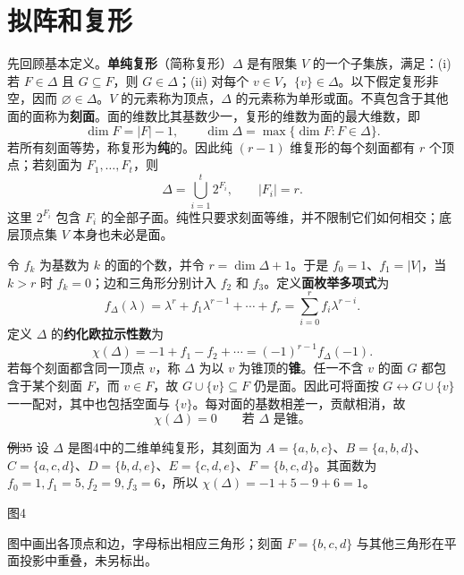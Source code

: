 \section*{拟阵和复形}
先回顾基本定义。\textbf{单纯复形}（简称复形）$\Delta$ 是有限集 $V$ 的一个子集族，满足：(i) 若 $F\in\Delta$ 且 $G\subseteq F$，则 $G\in\Delta$；(ii) 对每个 $v\in V$，$\{v\}\in\Delta$。以下假定复形非空，因而 $\varnothing\in\Delta$。$V$ 的元素称为顶点，$\Delta$ 的元素称为单形或面。不真包含于其他面的面称为\textbf{刻面}。面的维数比其基数少一，复形的维数为面的最大维数，即
\[\dim F=|F|-1,\qquad\dim\Delta=\max\{\dim F:F\in\Delta\}.\]
若所有刻面等势，称复形为\textbf{纯}的。因此纯 $(r-1)$ 维复形的每个刻面都有 $r$ 个顶点；若刻面为 $F_1,\ldots,F_t$，则
\[\Delta=\bigcup_{i=1}^t2^{F_i},\qquad |F_i|=r.\]
这里 $2^{F_i}$ 包含 $F_i$ 的全部子面。纯性只要求刻面等维，并不限制它们如何相交；底层顶点集 $V$ 本身也未必是面。

令 $f_k$ 为基数为 $k$ 的面的个数，并令 $r=\dim\Delta+1$。于是 $f_0=1$、$f_1=|V|$，当 $k>r$ 时 $f_k=0$；边和三角形分别计入 $f_2$ 和 $f_3$。定义\textbf{面枚举多项式}为
\[f_\Delta(\lambda)=\lambda^r+f_1\lambda^{r-1}+\cdots+f_r=\sum_{i=0}^rf_i\lambda^{r-i}.\tag{3}\label{eq:complex-face}\]
定义 $\Delta$ 的\textbf{约化欧拉示性数}为
\[\chi(\Delta)=-1+f_1-f_2+\cdots=(-1)^{r-1}f_\Delta(-1).\]
若每个刻面都含同一顶点 $v$，称 $\Delta$ 为以 $v$ 为锥顶的\textbf{锥}。任一不含 $v$ 的面 $G$ 都包含于某个刻面 $F$，而 $v\in F$，故 $G\cup\{v\}\subseteq F$ 仍是面。因此可将面按 $G\longleftrightarrow G\cup\{v\}$ 一一配对，其中也包括空面与 $\{v\}$。每对面的基数相差一，贡献相消，故
\[\chi(\Delta)=0\qquad\text{若 }\Delta\text{ 是锥。}\tag{4}\]

\st{例35} 设 $\Delta$ 是图4中的二维单纯复形，其刻面为 $A=\{a,b,c\}$、$B=\{a,b,d\}$、$C=\{a,c,d\}$、$D=\{b,d,e\}$、$E=\{c,d,e\}$、$F=\{b,c,d\}$。其面数为 $f_0=1,f_1=5,f_2=9,f_3=6$，所以 $\chi(\Delta)=-1+5-9+6=1$。
\begin{center}
\par\small 图4
\end{center}
图中画出各顶点和边，字母标出相应三角形；刻面 $F=\{b,c,d\}$ 与其他三角形在平面投影中重叠，未另标出。

